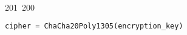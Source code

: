 201~200~\documentclass{article}
\begin{document}
\begin{lstlisting}[language=Python, caption=Decrypting a Message with ChaCha20-Poly1305]
	                                                                                                                                                                                                                                                                                                	                                                                                                                                        	    	                                                                                                	                                                                                                                                                                                                                                                                                                                                	                                                                        	                                                                        	                                                                                                                                        	                                                                                                                                                                                                                        	                                                                                                                            	                                                                	                                                                                                                                                                            cipher = ChaCha20Poly1305(encryption_key)

\end{lstlisting}
\end{document}
